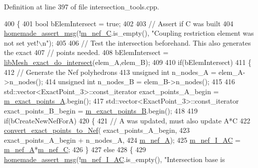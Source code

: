 Definition at line 397 of file intersection\+\_\+tools.\+cpp.


\begin{DoxyCode}
400 \{
401     \textcolor{keywordtype}{bool} bElemIntersect = \textcolor{keyword}{true};
402 
403     \textcolor{comment}{// Assert if C was built}
404     \hyperlink{common__header_8h_a593ccc80b790b2268653fcf6597bf451}{homemade\_assert\_msg}(!\hyperlink{classcarl_1_1_intersection___tools_adf2892a8902442fbfebb913e9a4fb8ac}{m\_nef\_C}.is\_empty(), \textcolor{stringliteral}{"Coupling restriction element was
       not set yet!\(\backslash\)n"});
405 
406     \textcolor{comment}{// Test the intersection beforehand. This also generates the exact}
407     \textcolor{comment}{// points needed.}
408     bElemIntersect = \hyperlink{classcarl_1_1_intersection___tools_ae7b16748a45a0579bafecb48ef2fc4ce}{libMesh\_exact\_do\_intersect}(elem\_A,elem\_B);
409 
410     \textcolor{keywordflow}{if}(bElemIntersect)
411     \{
412         \textcolor{comment}{// Generate the Nef polyhedrons}
413         \textcolor{keywordtype}{unsigned} \textcolor{keywordtype}{int} n\_nodes\_A = elem\_A->n\_nodes();
414         \textcolor{keywordtype}{unsigned} \textcolor{keywordtype}{int} n\_nodes\_B = elem\_B->n\_nodes();
415 
416         std::vector<ExactPoint\_3>::const\_iterator exact\_points\_A\_begin = 
      \hyperlink{classcarl_1_1_intersection___tools_ad636117b292272044b252be62124eb0a}{m\_exact\_points\_A}.begin();
417         std::vector<ExactPoint\_3>::const\_iterator exact\_points\_B\_begin = 
      \hyperlink{classcarl_1_1_intersection___tools_a2c3b6211dd1f9b0aa5f2ac8ffc383182}{m\_exact\_points\_B}.begin();
418 
419         \textcolor{keywordflow}{if}(bCreateNewNefForA)
420         \{
421             \textcolor{comment}{// A was updated, must also update A*C}
422             \hyperlink{classcarl_1_1_intersection___tools_af689c53cf00359c518234d8d070c4e53}{convert\_exact\_points\_to\_Nef}( exact\_points\_A\_begin,
423                                             exact\_points\_A\_begin + n\_nodes\_A,
424                                             \hyperlink{classcarl_1_1_intersection___tools_a66a33158af0779366d4109e96a10ddc4}{m\_nef\_A});
425             \hyperlink{classcarl_1_1_intersection___tools_a8333f16787459e65c4fe913dad50b5c6}{m\_nef\_I\_AC} = \hyperlink{classcarl_1_1_intersection___tools_a66a33158af0779366d4109e96a10ddc4}{m\_nef\_A}*\hyperlink{classcarl_1_1_intersection___tools_adf2892a8902442fbfebb913e9a4fb8ac}{m\_nef\_C};
426         \}
427         \textcolor{keywordflow}{else}
428         \{
429             \hyperlink{common__header_8h_a593ccc80b790b2268653fcf6597bf451}{homemade\_assert\_msg}(!\hyperlink{classcarl_1_1_intersection___tools_a8333f16787459e65c4fe913dad50b5c6}{m\_nef\_I\_AC}.is\_empty(), \textcolor{stringliteral}{"Intersection base is
}
\end{DoxyCode}
